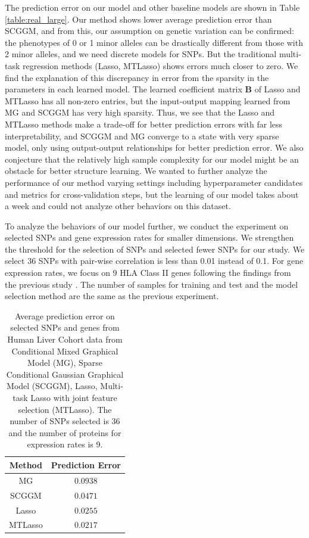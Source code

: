 \documentclass{article}
\begin{document}
The prediction error on our model and other baseline models are shown in Table \ref{table:real_large}. Our method shows lower average prediction error than SCGGM, and from this, our assumption on genetic variation can be confirmed: the phenotypes of 0 or 1 minor alleles can be drastically different from those with 2 minor alleles, and we need discrete models for SNPs. But the traditional multi-task regression methods (Lasso, MTLasso) shows errors much closer to zero. We find the explanation of this discrepancy in error from the sparsity in the parameters in each learned model. The learned coefficient matrix $\textbf{B}$ of Lasso and MTLasso has all non-zero entries, but the input-output mapping learned from MG and SCGGM has very high sparsity. Thus, we see that the Lasso and MTLasso methods make a trade-off for better prediction errors with far less interpretability, and SCGGM and MG converge to a state with very sparse model, only using output-output relationships for better prediction error. We also conjecture that the relatively high sample complexity for our model might be an obstacle for better structure learning. We wanted to further analyze the performance of our method varying settings including hyperparameter candidates and metrics for cross-validation steps, but the learning of our model takes about a week and could not analyze other behaviors on this dataset.

To analyze the behaviors of our model further, we conduct the experiment on selected SNPs and gene expression rates for smaller dimensions. We strengthen the threshold for the selection of SNPs and selected fewer SNPs for our study. We select 36 SNPs with pair-wise correlation is less than 0.01 instead of 0.1. For gene expression rates, we focus on 9 HLA Class II genes following the findings from the previous study \cite{burton2007genome}. The number of samples for training and test and the model selection method are the same as the previous experiment.

\begin{table}
\begin{center}
    \begin{tabular}{| c | c |}
    \hline
    Method & Prediction Error \\
    \hline
    MG & $0.0938$ \\
    SCGGM & $0.0471$  \\
    Lasso & $0.0255$  \\
    MTLasso & $0.0217$ \\
    \hline 
    \end{tabular}
\end{center}
\caption{Average prediction error on selected SNPs and genes from Human Liver Cohort data from Conditional Mixed Graphical Model (MG), Sparse Conditional Gaussian Graphical Model (SCGGM), Lasso, Multi-task Lasso with joint feature selection (MTLasso). The number of SNPs selected is 36 and the number of proteins for expression rates is 9.}
\label{table:real_small}
\end{table}
\end{document}
